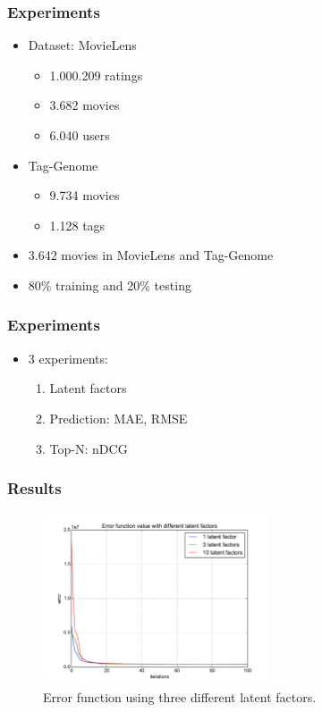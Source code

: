 \documentclass[aspectratio=169,handout]{beamer}
\begin{document}
\begin{frame}
\frametitle{Experiments}
\begin{itemize}
\item Dataset: MovieLens
\begin{itemize}
\item 1.000.209 ratings
\item 3.682 movies
\item 6.040 users
\end{itemize}
\pause
\item Tag-Genome
\begin{itemize}
\item 9.734 movies
\item 1.128 tags
\end{itemize}
\pause
\item 3.642 movies in MovieLens and Tag-Genome
\pause
\item 80\% training and 20\% testing
\end{itemize}
\end{frame}

\begin{frame}
\frametitle{Experiments}
\begin{itemize}
\item 3 experiments:
\pause
\begin{enumerate}
\item Latent factors
\item Prediction: MAE, RMSE
\item Top-N: nDCG
\end{enumerate}
\end{itemize}
\end{frame}

\begin{frame}
\frametitle{Results}
\begin{figure}[!htb]
\centering
\includegraphics[width=0.6\textwidth]{exp1}
\caption{Error function using three different latent factors.}
\label{fig:error}
\end{figure}
\end{frame}
\end{document}
